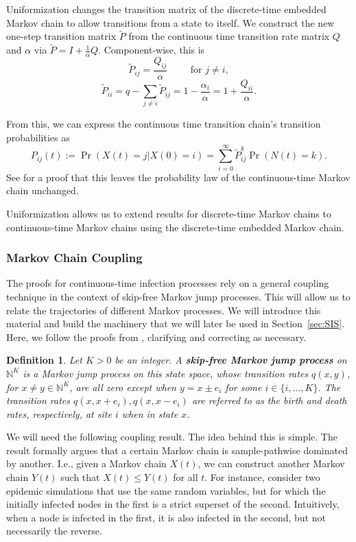 \documentclass[11pt]{article}
\newtheorem{definition}{Definition}[section]
\begin{document}
Uniformization changes the transition matrix of the discrete-time embedded Markov chain to allow transitions from a state to itself. We construct the new one-step transition matrix $\tilde P$ from the continuous time transition rate matrix $Q$ and $\alpha$ via $\tilde P = I + \frac{1}{\alpha}Q$. Component-wise, this is
$$\tilde P_{ij} = \frac{Q_{ij}}{\alpha} \hspace{1cm} \text{for } j\neq i,$$
$$\tilde P_{ii} = q - \sum_{j\neq i} \tilde P_{ij} = 1 - \frac{\alpha_i}{\alpha} = 1+\frac{Q_{ii}}{\alpha}.$$

From this, we can express the continuous time transition chain's transition probabilities as
$$P_{ij}(t) := \Pr(X(t) = j|X(0)=i) = \sum_{i=0}^\infty \tilde P_{ij}^k \Pr(N(t) = k).$$
See \cite{whitt:ctmc} for a proof that this leaves the probability law of the continuous-time Markov chain unchanged.

Uniformization allows us to extend results for discrete-time Markov chains to continuous-time Markov chains using the discrete-time embedded Markov chain.

\subsubsection{Markov Chain Coupling}

The proofs for continuous-time infection processes rely on a general coupling technique in the context of skip-free Markov jump processes. This will allow us to relate the trajectories of different Markov processes. We will introduce this material and build the machinery that we will later be used in Section~\ref{sec:SIS}. Here, we follow the proofs from \cite{draief:epidemics}, clarifying and correcting as necessary.

\begin{definition}
Let $K>0$ be an integer. A \textbf{skip-free Markov jump process} on $\mathbb{N}^K$ is a Markov jump process on this state space, whose transition rates $q(x,y)$, for $x\neq y \in \mathbb{N}^K$, are all zero except when $y=x \pm e_i$ for some $i\in\{ i,\ldots,K\}$. The transition rates $q(x,x+e_i),q(x,x-e_i)$ are referred to as the birth and death rates, respectively, at site $i$ when in state $x$.
\end{definition}

We will need the following coupling result. The idea behind this is simple. The result formally argues that a certain Markov chain is sample-pathwise dominated by another. I.e., given a Markov chain $X(t)$, we can construct another Markov chain $Y(t)$ such that $X(t)\leq Y(t)$ for all $t$. For instance, consider two epidemic simulations that use the same random variables, but for which the initially infected nodes in the first is a strict superset of the second. Intuitively, when a node is infected in the first, it is also infected in the second, but not necessarily the reverse.
\end{document}
